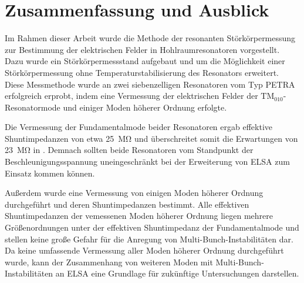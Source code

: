 \chapter{Zusammenfassung und Ausblick}
\label{sec:fazit}
Im Rahmen dieser Arbeit wurde die Methode der resonanten Störkörpermessung zur Bestimmung der elektrischen Felder in Hohlraumresonatoren vorgestellt.
Dazu wurde ein Störkörpermessstand aufgebaut und um die Möglichkeit einer Störkörpermessung ohne Temperaturstabilisierung des Resonators erweitert.
Diese Messmethode wurde an zwei siebenzelligen Resonatoren vom Typ PETRA erfolgreich erprobt, indem eine Vermessung der elektrischen Felder der $\mathrm{TM}_{010}$-Resonatormode und einiger Moden höherer Ordnung erfolgte.

Die Vermessung der Fundamentalmode beider Resonatoren ergab effektive Shuntimpedanzen von etwa \SI{25}{\mega\ohm} und überschreitet somit die Erwartungen von \SI{23}{\mega\ohm} in \cite{schedler}.
Demnach sollten beide Resonatoren vom Standpunkt der Beschleunigungsspannung uneingeschränkt bei der Erweiterung von ELSA zum Einsatz kommen können.

Außerdem wurde eine Vermessung von einigen Moden höherer Ordnung durchgeführt und deren Shuntimpedanzen bestimmt.
Alle effektiven Shuntimpedanzen der vemessenen Moden höherer Ordnung liegen mehrere Größenordnungen unter der effektiven Shuntimpedanz der Fundamentalmode und stellen keine große Gefahr für die Anregung von Multi-Bunch-Instabilitäten dar.
Da keine umfassende Vermessung aller Moden höherer Ordnung durchgeführt wurde, kann der Zusammenhang von weiteren Moden mit Multi-Bunch-Instabilitäten an ELSA eine Grundlage für zukünftige Untersuchungen darstellen.
